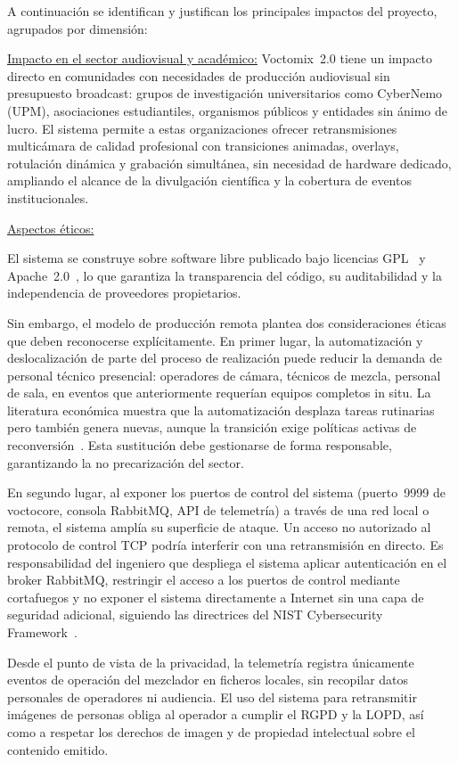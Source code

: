 \normalsize{A continuación se identifican y justifican los principales impactos del proyecto,
agrupados por dimensión:}

\vspace{0.15cm}
\noindent\underline{Impacto en el sector audiovisual y académico:}
\normalsize{ Voctomix~2.0 tiene un impacto directo en comunidades con necesidades de producción
audiovisual sin presupuesto broadcast: grupos de investigación universitarios como CyberNemo (UPM),
asociaciones estudiantiles, organismos públicos y entidades sin ánimo de lucro. El sistema
permite a estas organizaciones ofrecer retransmisiones multicámara de calidad profesional con
transiciones animadas, overlays, rotulación dinámica y grabación simultánea, sin necesidad de
hardware dedicado, ampliando el alcance de la divulgación científica y la cobertura de eventos
institucionales.}

\vspace{0.15cm}
\noindent\underline{Aspectos éticos:}
\normalsize{ El sistema se construye sobre software libre publicado bajo licencias GPL~\cite{gpl_v2} y
Apache~2.0~\cite{apache2_license}, lo que garantiza la transparencia del código, su auditabilidad y la independencia de
proveedores propietarios.

Sin embargo, el modelo de producción remota plantea dos consideraciones éticas que deben
reconocerse explícitamente. En primer lugar, la automatización y deslocalización de parte del
proceso de realización puede reducir la demanda de personal técnico presencial: operadores de
cámara, técnicos de mezcla, personal de sala, en eventos que anteriormente requerían equipos
completos in situ. La literatura económica muestra que la automatización desplaza tareas
rutinarias pero también genera nuevas, aunque la transición exige políticas activas de
reconversión~\cite{acemoglu2019automation}. Esta sustitución debe gestionarse de forma
responsable, garantizando la no precarización del sector.

En segundo lugar, al exponer los puertos de control del sistema (puerto~9999 de voctocore,
consola RabbitMQ, API de telemetría) a través de una red local o remota, el sistema amplía su
superficie de ataque. Un acceso no autorizado al protocolo de control TCP podría interferir con
una retransmisión en directo. Es responsabilidad del ingeniero que despliega el sistema aplicar
autenticación en el broker RabbitMQ, restringir el acceso a los puertos de control mediante
cortafuegos y no exponer el sistema directamente a Internet sin una capa de seguridad adicional,
siguiendo las directrices del NIST Cybersecurity Framework~\cite{nist_csf2}.

Desde el punto de vista de la privacidad, la telemetría registra únicamente eventos de operación
del mezclador en ficheros locales, sin recopilar datos personales de operadores ni audiencia. El
uso del sistema para retransmitir imágenes de personas obliga al operador a cumplir el RGPD y la
LOPD, así como a respetar los derechos de imagen y de propiedad intelectual sobre el contenido
emitido.}

